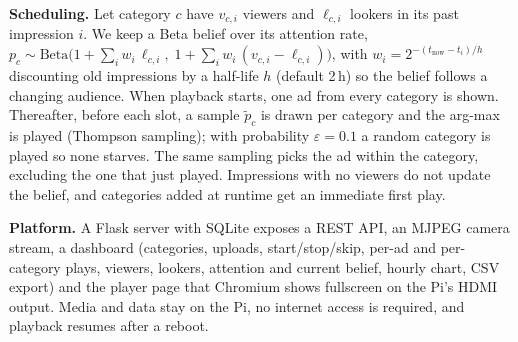 \documentclass[10pt,a4paper]{article}
\begin{document}
\textbf{Scheduling.} Let category $c$ have $v_{c,i}$ viewers and $\ell_{c,i}$ lookers in its past impression
$i$. We keep a Beta belief over its attention rate,
$p_c\sim\mathrm{Beta}\big(1+\sum_i w_i\,\ell_{c,i},\;1+\sum_i w_i\,(v_{c,i}-\ell_{c,i})\big)$, with
$w_i=2^{-(t_{\text{now}}-t_i)/h}$ discounting old impressions by a half-life $h$ (default 2\,h) so the belief
follows a changing audience. When playback starts, one ad from every category is shown. Thereafter, before each
slot, a sample $\tilde p_c$ is drawn per category and the arg-max is played (Thompson sampling); with
probability $\varepsilon=0.1$ a random category is played so none starves. The same sampling picks the ad
within the category, excluding the one that just played. Impressions with no viewers do not update the belief,
and categories added at runtime get an immediate first play.

\textbf{Platform.} A Flask server with SQLite exposes a REST API, an MJPEG camera stream, a dashboard
(categories, uploads, start/stop/skip, per-ad and per-category plays, viewers, lookers, attention and current
belief, hourly chart, CSV export) and the player page that Chromium shows fullscreen on the Pi's HDMI output.
Media and data stay on the Pi, no internet access is required, and playback resumes after a reboot.
\end{document}
